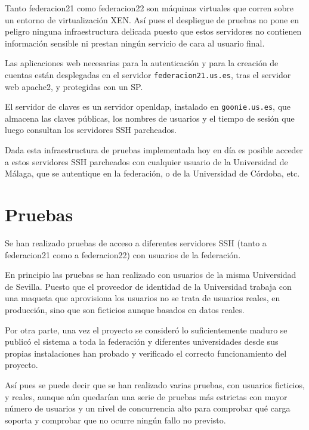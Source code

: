     Tanto federacion21 como federacion22 son máquinas virtuales que corren
    sobre un entorno de virtualización XEN. Así pues el despliegue de
    pruebas no pone en peligro ninguna infraestructura delicada puesto que
    estos servidores no contienen información sensible ni prestan ningún
    servicio de cara al usuario final.

    Las aplicaciones web necesarias para la autenticación y para la
    creación de cuentas están desplegadas en el servidor
    \texttt{federacion21.us.es}, tras el servidor web apache2, y protegidas
    con un SP.

    El servidor de claves es un servidor openldap, instalado en
    \texttt{goonie.us.es}, que almacena las claves públicas, los nombres de
    usuarios y el tiempo de sesión que luego consultan los servidores SSH
    parcheados.

    Dada esta infraestructura de pruebas implementada hoy en día es posible
    acceder a estos servidores SSH parcheados con cualquier usuario de la
    Universidad de Málaga, que se autentique en la federación, o de la
    Universidad de Córdoba, etc.

\section{Pruebas}

    Se han realizado pruebas de acceso a diferentes servidores SSH (tanto a
    federacion21 como a federacion22) con usuarios de la federación.

    En principio las pruebas se han realizado con usuarios de la misma
    Universidad de Sevilla. Puesto que el proveedor de identidad de la
    Universidad trabaja con una maqueta que aprovisiona los usuarios no se
    trata de usuarios reales, en producción, sino que son ficticios aunque
    basados en datos reales.

    Por otra parte, una vez el proyecto se consideró lo suficientemente
    maduro se publicó el sistema a toda la federación y diferentes
    universidades desde sus propias instalaciones han probado y verificado
    el correcto funcionamiento del proyecto.

    Así pues se puede decir que se han realizado varias pruebas, con
    usuarios ficticios, y reales, aunque aún quedarían una serie de pruebas
    más estrictas con mayor número de usuarios y un nivel de concurrencia
    alto para comprobar qué carga soporta y comprobar que no ocurre
    ningún fallo no previsto.

